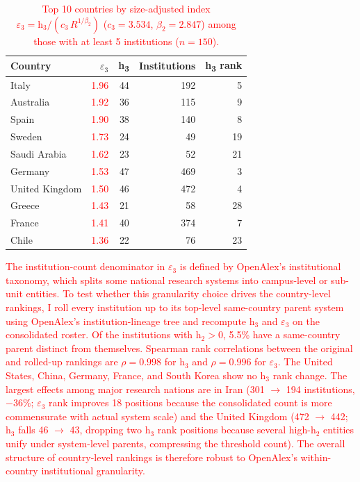 \begin{table}[h]
	\centering
	\caption{\textcolor{red}{Top 10 countries by size-adjusted index $\varepsilon_3 = \mathrm{h}_3 / (c_3\,R^{1/\beta_2})$ ($c_3 = 3.534$, $\beta_2 = 2.847$) among those with at least 5 institutions ($n = 150$).}}
	\label{tab:h3-efficiency}
	\begin{tabular}{@{}lrrrr@{}}
	\toprule
	Country & $\varepsilon_3$ & h\textsubscript{3} & Institutions & h\textsubscript{3} rank \\
	\midrule
	Italy          & \textcolor{red}{1.96} & 44 & 192   & 5 \\
	Australia      & \textcolor{red}{1.92} & 36 & 115   & 9 \\
	Spain          & \textcolor{red}{1.90} & 38 & 140   & 8 \\
	Sweden         & \textcolor{red}{1.73} & 24 & 49    & 19 \\
	Saudi Arabia   & \textcolor{red}{1.62} & 23 & 52    & 21 \\
	Germany        & \textcolor{red}{1.53} & 47 & 469   & 3 \\
	United Kingdom & \textcolor{red}{1.50} & 46 & 472   & 4 \\
	Greece         & \textcolor{red}{1.43} & 21 & 58    & 28 \\
	France         & \textcolor{red}{1.41} & 40 & 374   & 7 \\
	Chile          & \textcolor{red}{1.36} & 22 & 76    & 23 \\
	\bottomrule
	\end{tabular}
\end{table}

\textcolor{red}{The institution-count denominator in $\varepsilon_3$ is defined by OpenAlex's institutional taxonomy, which splits some national research systems into campus-level or sub-unit entities. To test whether this granularity choice drives the country-level rankings, I roll every institution up to its top-level same-country parent system using OpenAlex's institution-lineage tree and recompute $\mathrm{h}_3$ and $\varepsilon_3$ on the consolidated roster. Of the institutions with $\mathrm{h}_2 > 0$, 5.5\% have a same-country parent distinct from themselves. Spearman rank correlations between the original and rolled-up rankings are $\rho = 0.998$ for $\mathrm{h}_3$ and $\rho = 0.996$ for $\varepsilon_3$. The United States, China, Germany, France, and South Korea show no $\mathrm{h}_3$ rank change. The largest effects among major research nations are in Iran (301 $\to$ 194 institutions, $-36\%$; $\varepsilon_3$ rank improves 18 positions because the consolidated count is more commensurate with actual system scale) and the United Kingdom (472 $\to$ 442; $\mathrm{h}_3$ falls 46 $\to$ 43, dropping two $\mathrm{h}_3$ rank positions because several high-$\mathrm{h}_2$ entities unify under system-level parents, compressing the threshold count). The overall structure of country-level rankings is therefore robust to OpenAlex's within-country institutional granularity.}


